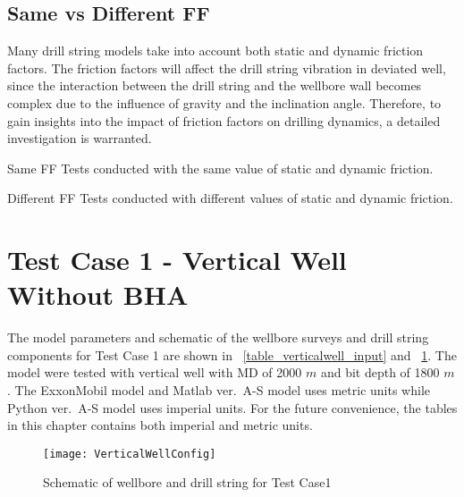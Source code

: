 \subsection{Same vs Different FF}

Many drill string models take into account both static and dynamic friction factors. The friction factors will affect the drill string vibration in deviated well, since the interaction between the drill string and the wellbore wall becomes complex due to the influence of gravity and the inclination angle.\wording{}
Therefore, to gain insights into the impact of friction factors on drilling dynamics, a detailed investigation is warranted.\wording{}

\begin{definition}{Same FF}
Tests conducted with the same value of static and dynamic friction.
\end{definition}
\begin{definition}{Different FF}
Tests conducted with different values of static and dynamic friction.
\end{definition}




\section{Test Case 1 - Vertical Well Without BHA}
The model parameters and schematic of the wellbore surveys and drill string components for Test Case 1 are shown in \tablename~\ref{table_verticalwell_input} and \figurename~\ref{figure_verticalwell}. The model were tested with vertical well with MD of 2000 $m$ and bit depth of 1800 $m$. The ExxonMobil model and Matlab ver.\ A-S model uses metric units while Python ver.\ A-S model uses imperial units. For the future convenience, the tables in this chapter contains both imperial and metric units.

\begin{figure}[!hbt]
  \centering
  \texttt{[image: VerticalWellConfig]}
  \caption[Schematic of wellbore and drill string for Test Case1]{Schematic of wellbore and drill string for Test Case1}\label{figure_verticalwell}
\end{figure}

